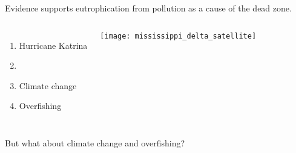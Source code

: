 \documentclass[t]{beamer}
\begin{document}
\begin{frame}{Evidence supports eutrophication from pollution as a cause of the dead zone.}

	\begin{columns}[t]
			\begin{enumerate}
				\item Hurricane Katrina
				\item {}
				\item Climate change
				\item Overfishing
			\end{enumerate}
			

			\texttt{[image: mississippi\_delta\_satellite]}

	\end{columns}
	
	
	\hangpara But what about climate change and overfishing?
	
\end{frame}
%
\end{document}
